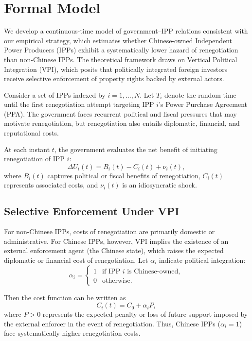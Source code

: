 \documentclass[12pt]{article}
\begin{document}
\section{Formal Model}

We develop a continuous-time model of government–IPP relations consistent with our empirical strategy, which estimates whether Chinese-owned Independent Power Producers (IPPs) exhibit a systematically lower hazard of renegotiation than non-Chinese IPPs. The theoretical framework draws on Vertical Political Integration (VPI), which posits that politically integrated foreign investors receive selective enforcement of property rights backed by external actors.

Consider a set of IPPs indexed by $i = 1,\dots,N$. Let $T_i$ denote the random time until the first renegotiation attempt targeting IPP $i$'s Power Purchase Agreement (PPA). The government faces recurrent political and fiscal pressures that may motivate renegotiation, but renegotiation also entails diplomatic, financial, and reputational costs. 

At each instant $t$, the government evaluates the net benefit of initiating renegotiation of IPP $i$:
\[
\Delta U_i(t) = B_i(t) - C_i(t) + \nu_i(t),
\]
where $B_i(t)$ captures political or fiscal benefits of renegotiation, $C_i(t)$ represents associated costs, and $\nu_i(t)$ is an idiosyncratic shock.

\subsection*{Selective Enforcement Under VPI}

For non-Chinese IPPs, costs of renegotiation are primarily domestic or administrative. For Chinese IPPs, however, VPI implies the existence of an external enforcement agent (the Chinese state), which raises the expected diplomatic or financial cost of renegotiation. Let $\alpha_i$ indicate political integration:
\[
\alpha_i = 
\begin{cases}
1 & \text{if IPP } i \text{ is Chinese-owned},\\
0 & \text{otherwise}.
\end{cases}
\]

Then the cost function can be written as
\[
C_i(t) = C_0 + \alpha_i P,
\]
where $P > 0$ represents the expected penalty or loss of future support imposed by the external enforcer in the event of renegotiation. Thus, Chinese IPPs ($\alpha_i = 1$) face systematically higher renegotiation costs.
\end{document}
